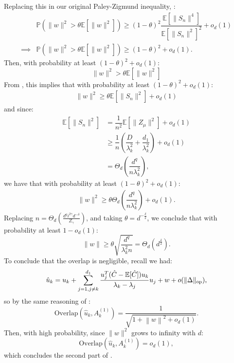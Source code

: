 \documentclass[]{article}
\numberwithin{equation}{section}
\theoremstyle{definition}
\newcommand{\EE}{\mathbb{E}}
\def\op{{\rm op}}
\begin{document}
Replacing this in our original Paley-Zigmund inequality, : 
\begin{align}
& \mathbb{P} \left ( \| w\|^2 > \theta  \EE\left [ \|w\|^2\right ]\right ) \geq (1-\theta)^2 \dfrac{\EE \left [ \|S_{n}\|^4 \right ]}{\EE \left [ \| S_{n}\|^2\right ]^2} + o_{d}(1) \\
\implies & \mathbb{P} \left ( \| w\|^2 > \theta  \EE\left [ \|w\|^2\right ]\right ) \geq (1-\theta)^2 +  o_{d}(1).
\end{align}
Then, with probability at least $(1 - \theta )^2 + o_{d}(1)$: 
\begin{equation}
    \| w\|^2 > \theta  \EE\left [ \|w\|^2\right ]
\end{equation}
From , this implies that with probability at least $(1 - \theta )^2 + o_{d}(1)$: 
\begin{align}
\| w\|^2 \geq \theta  \EE\left [ \|S_n\|^2 \right ]+ o_{d}(1)
\end{align}
and since: 
\begin{align}
    \EE \left [ \|S_{n}\|^2 \right ] &=  \dfrac{1}{n^2}\EE \left [ \| Z_\mu \|^2\right ] + o_{d}(1) \\ 
    & \geq  \dfrac{1}{n} \left ( \dfrac{D}{\lambda_{k}^2} + \dfrac{d_1}{\lambda_{k}^2} \right )+ o_{d}(1) \\
    & = \Theta_{d} \left ( \dfrac{d^{q}}{n \lambda_{k}^2} \right ),
\end{align}
we have that with probability at least $(1 - \theta )^2 + o_{d}(1)$: 
\begin{align}
\| w\|^2 \geq \theta  \Theta_{d} \left ( \dfrac{d^{q}}{n \lambda_{k}^2} \right ) + o_{d}(1).
\end{align}
Replacing $n = \Theta_{d} \left ( \frac{d^{q}i^{2\gamma} d^{-\delta}}{Z_\gamma} \right )$, and taking $\theta =d^{-\frac{\delta}{2}}$, we conclude that with probability at least $1 - o_{d}(1)$: 
\begin{equation}
    \| w\| \geq \theta \sqrt{\dfrac{d^{q}}{\lambda_k^{2}n}} = \Theta_{d}(d^{\frac{\delta}{2}}). 
\end{equation}
To conclude that the overlap is negligible, recall we had: 
\begin{equation}
    \hat{u}_{k} = u_k + \sum_{j=1, j \not = k}^{d_1} \dfrac{u_j^T (\hat{C} - \EE [\hat{C}])u_k}{ \lambda_k - \lambda_j } u_j + w + o(\| \Delta\|_\op),
\end{equation}
so by the same reasoning of :
\begin{equation}
    \mathrm{Overlap}(\hat{u}_{k}, A^{(1)}_{k})  = \dfrac{1}{\sqrt{1 + \left \| w \right \|^{2}+ o_{d}(1) }}.
\end{equation}
Then, with high probability, since $\| w\|^{2}$ grows to infinity with $d$: 
\begin{equation}
    \mathrm{Overlap}(\hat{u}_{k}, A^{(1)}_{k}) = o_{d}(1), 
\end{equation}
which concludes the second part of . 
\end{document}
